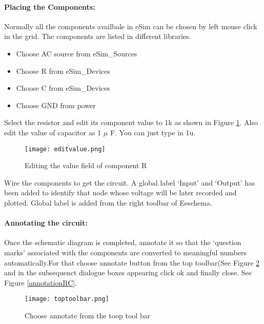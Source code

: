 \paragraph{Placing the Components:} Normally all the components availbale in eSim can be chosen by left mouse click in the grid. The components are listed in different libraries. %


\begin{itemize}
\item
Choose AC source from eSim\_Sources
\item
Choose R from eSim\_Devices
\item
Choose C from eSim\_Devices
\item
Choose GND from power
\end{itemize}

Select the resistor and edit its component value to 1k as shown in Figure \ref{editvalueR}. Also edit the value of capacitor as 1 $\mu$ F. You can just type in 1u.

\begin{figure}[h]
\centering
\texttt{[image: editvalue.png]}
\caption{Editing the value field of component R}
\label{editvalueR}
\end{figure}

Wire the components to get the circuit. A global label `Input'  and `Output' has been added to identify that node whose voltage will be later recorded and plotted. Global label is added from the right toolbar of Eeschema.

\paragraph{Annotating the circuit:} Once the schematic diagram is completed, annotate it so that the `question marks' associated with the components are converted to meaningful numbers automatically.For that choose annotate button from the top toolbar(See Figure \ref{toptoolbarRC} and in the subsequenct dialogue boxes appearing click ok and finally close. See Figure \ref{annotationRC}.

\begin{figure}[h]
\centering
\texttt{[image: toptoolbar.png]}
\caption{Choose annotate from the toop tool bar}
\label{toptoolbarRC}
\end{figure}



